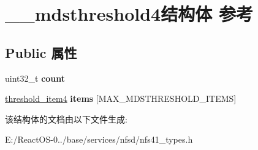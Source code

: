 \hypertarget{struct____mdsthreshold4}{}\section{\+\_\+\+\_\+mdsthreshold4结构体 参考}
\label{struct____mdsthreshold4}
\subsection*{Public 属性}
\begin{DoxyCompactItemize}
\item 
\mbox{\label{struct____mdsthreshold4_a1e2510ac6945ea2d76903cb48fd07e10}} 
uint32\+\_\+t {\bfseries count}
\item 
\mbox{\label{struct____mdsthreshold4_aa630f816cdd12e8de77ea9eeac6a7e23}} 
\hyperlink{struct____threshold__item4}{threshold\+\_\+item4} {\bfseries items} \mbox{[}M\+A\+X\+\_\+\+M\+D\+S\+T\+H\+R\+E\+S\+H\+O\+L\+D\+\_\+\+I\+T\+E\+MS\mbox{]}
\end{DoxyCompactItemize}


该结构体的文档由以下文件生成\+:\begin{DoxyCompactItemize}
\item 
E\+:/\+React\+O\+S-\/0../base/services/nfsd/nfs41\+\_\+types.\+h\end{DoxyCompactItemize}
